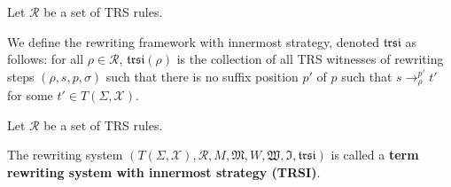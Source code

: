   
  \begin{definition}
    Let $\mathcal{R}$ be a set of TRS rules. 
  
    We define the rewriting framework with innermost strategy, denoted $\mathfrak{trsi}$ as follows: for all $\rho \in \mathcal{R}$, $\mathfrak{trsi}(\rho)$ is the collection of all TRS witnesses of rewriting steps $(\rho, s, p, \sigma)$ such that there is no suffix position $p'$ of $p$ such that $s \to_\rho^{p'} t'$ for some $t' \in T(\Sigma,\mathcal{X})$.
  \end{definition}
  
  \begin{definition}
    Let $\mathcal{R}$ be a set of TRS rules. 
  
    The rewriting system $(T(\Sigma,\mathcal{X}), \mathcal{R}, M, \mathfrak{M}, W, \mathfrak{W}, \mathfrak{I}, \mathfrak{trsi})$ is called a \textbf{term rewriting system with innermost strategy (TRSI)}.
  \end{definition}
  

